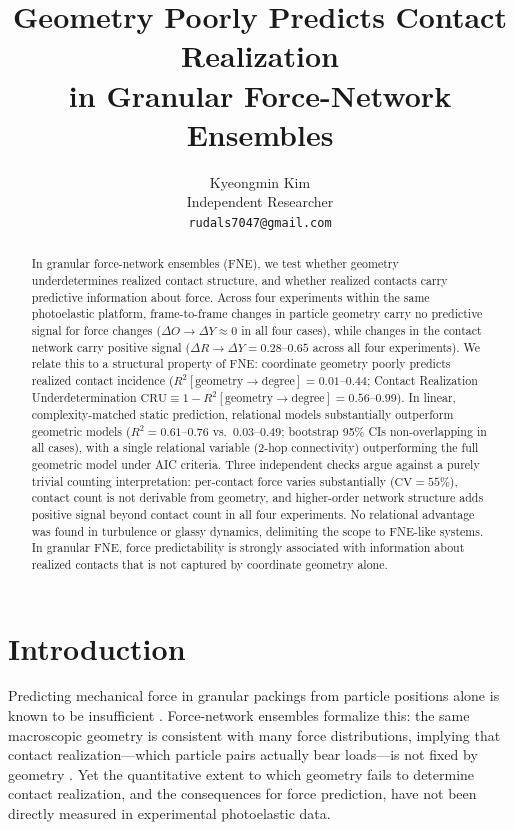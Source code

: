 \documentclass[11pt,a4paper]{article}
\title{\textbf{Geometry Poorly Predicts Contact Realization\\in Granular Force-Network Ensembles}}
\author{Kyeongmin Kim\\
\small Independent Researcher\\
\small \texttt{rudals7047@gmail.com}}
\date{}
\begin{document}
\maketitle
\thispagestyle{empty}

\begin{abstract}
In granular force-network ensembles (FNE), we test whether geometry underdetermines realized contact structure, and whether realized contacts carry predictive information about force.
Across four experiments within the same photoelastic platform, frame-to-frame changes in particle geometry carry no predictive signal for force changes ($\Delta O\!\rightarrow\!\Delta Y \approx 0$ in all four cases), while changes in the contact network carry positive signal ($\Delta R\!\rightarrow\!\Delta Y = 0.28$--$0.65$ across all four experiments).
We relate this to a structural property of FNE: coordinate geometry poorly predicts realized contact incidence ($R^2[\text{geometry}\!\rightarrow\!\text{degree}] = 0.01$--$0.44$; Contact Realization Underdetermination $\mathrm{CRU} \equiv 1 - R^2[\text{geometry}\!\rightarrow\!\text{degree}] = 0.56$--$0.99$).
In linear, complexity-matched static prediction, relational models substantially outperform geometric models ($R^2 = 0.61$--$0.76$ vs.\ $0.03$--$0.49$; bootstrap 95\% CIs non-overlapping in all cases), with a single relational variable (2-hop connectivity) outperforming the full geometric model under AIC criteria.
Three independent checks argue against a purely trivial counting interpretation: per-contact force varies substantially ($\mathrm{CV} = 55\%$), contact count is not derivable from geometry, and higher-order network structure adds positive signal beyond contact count in all four experiments.
No relational advantage was found in turbulence or glassy dynamics, delimiting the scope to FNE-like systems.
In granular FNE, force predictability is strongly associated with information about realized contacts that is not captured by coordinate geometry alone.
\end{abstract}

\newpage

\section{Introduction}

Predicting mechanical force in granular packings from particle positions alone is known to be insufficient \cite{tighe2010,unger2005}.
Force-network ensembles formalize this: the same macroscopic geometry is consistent with many force distributions, implying that contact realization---which particle pairs actually bear loads---is not fixed by geometry \cite{unger2005,snoeijer2004}.
Yet the quantitative extent to which geometry fails to determine contact realization, and the consequences for force prediction, have not been directly measured in experimental photoelastic data.
\end{document}
